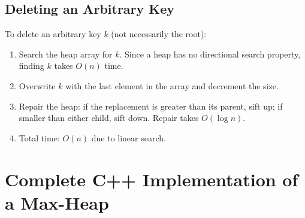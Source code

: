 \subsection{Deleting an Arbitrary Key}
To delete an arbitrary key $k$ (not necessarily the root):
\begin{enumerate}
    \item Search the heap array for $k$. Since a heap has no directional search property, finding $k$ takes $O(n)$ time.
    \item Overwrite $k$ with the last element in the array and decrement the size.
    \item Repair the heap: if the replacement is greater than its parent, sift up; if smaller than either child, sift down. Repair takes $O(\log n)$.
    \item Total time: $O(n)$ due to linear search.
\end{enumerate}

\section{Complete C++ Implementation of a Max-Heap}

